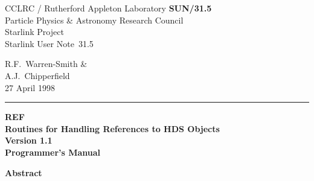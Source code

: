 \documentclass[twoside,11pt]{article}
\newcommand{\stardoccategory}  {Starlink User Note}
\newcommand{\stardocinitials}  {SUN}
\newcommand{\stardocnumber}    {31.5}
\newcommand{\stardocauthors}   {R.F.~Warren-Smith \& \\
                                A.J.~Chipperfield}
\newcommand{\stardocdate}      {27 April 1998}
\newcommand{\stardoctitle}     {REF \\ [\latex{1ex}]
                                Routines for Handling References
                                to HDS Objects}
\newcommand{\stardocversion}   {Version 1.1}
\newcommand{\stardocmanual}    {Programmer's Manual}
\newcommand{\stardocname}{\stardocinitials /\stardocnumber}
\newenvironment{latexonly}{}{}
\newcommand{\latex}[1]{#1}
\begin{document}
\thispagestyle{empty}

\begin{latexonly}
   CCLRC / {\sc Rutherford Appleton Laboratory} \hfill {\bf \stardocname}\\
   {\large Particle Physics \& Astronomy Research Council}\\
   {\large Starlink Project\\}
   {\large \stardoccategory\ \stardocnumber}
   \begin{flushright}
   \stardocauthors\\
   \stardocdate
   \end{flushright}
   \vspace{-4mm}
   \rule{\textwidth}{0.5mm}
   \vspace{5mm}
   \begin{center}
   {\Huge\bf  \stardoctitle \\ [2.5ex]}
   {\LARGE\bf \stardocversion \\ [4ex]}
   {\Huge\bf  \stardocmanual}
   \end{center}
   \vspace{5mm}


   \vspace{10mm}
   \begin{center}
      {\Large\bf Abstract}
   \end{center}
\end{latexonly}
\end{document}
